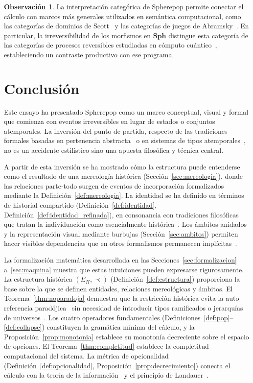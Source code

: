 \documentclass[12pt]{article}
\theoremstyle{plain}
\theoremstyle{definition}
\newtheorem{remark}[theorem]{Observación}
\begin{document}
\begin{remark}
La interpretación categórica de Spherepop permite conectar el cálculo con marcos más generales utilizados en semántica computacional, como las categorías de dominios de Scott~\cite{scottdana,abramsky} y las categorías de juegos de Abramsky~\cite{abramsky}. En particular, la irreversibilidad de los morfismos en $\mathbf{Sph}$ distingue esta categoría de las categorías de procesos reversibles estudiadas en cómputo cuántico~\cite{baez}, estableciendo un contraste productivo con ese programa.
\end{remark}

\section{Conclusión}
\label{sec:conclusion}

Este ensayo ha presentado Spherepop como un marco conceptual, visual y formal que comienza con eventos irreversibles en lugar de estados o conjuntos atemporales. La inversión del punto de partida, respecto de las tradiciones formales basadas en pertenencia abstracta~\cite{cantor,zermelo} o en sistemas de tipos atemporales~\cite{martinlof,homotopy}, no es un accidente estilístico sino una apuesta filosófica y técnica central.

A partir de esta inversión se ha mostrado cómo la estructura puede entenderse como el resultado de una mereología histórica (Sección~\ref{sec:mereologia}), donde las relaciones parte-todo surgen de eventos de incorporación formalizados mediante la Definición~\ref{def:mereologia}. La identidad se ha definido en términos de historial compartido (Definición~\ref{def:identidad}, Definición~\ref{def:identidad_refinada}), en consonancia con tradiciones filosóficas que tratan la individuación como esencialmente histórica~\cite{kim,fine,wiggins}. Los ámbitos anidados y la representación visual mediante burbujas (Sección~\ref{sec:ambitos}) permiten hacer visibles dependencias que en otros formalismos permanecen implícitas~\cite{winskel,plotkin}.

La formalización matemática desarrollada en las Secciones~\ref{sec:formalizacion} a~\ref{sec:maquina} muestra que estas intuiciones pueden expresarse rigurosamente. La estructura histórica $(E_H, \prec)$ (Definición~\ref{def:estructura}) proporciona la base sobre la que se definen entidades, relaciones mereológicas y ámbitos. El Teorema~\ref{thm:noparadoja} demuestra que la restricción histórica evita la auto-referencia paradójica~\cite{russellparadox} sin necesidad de introducir tipos ramificados o jerarquías de universos~\cite{martinlof}. Los cuatro operadores fundamentales (Definiciones~\ref{def:pop}--\ref{def:collapse}) constituyen la gramática mínima del cálculo, y la Proposición~\ref{prop:monotonia} establece su monotonía decreciente sobre el espacio de opciones. El Teorema~\ref{thm:completitud} establece la completitud computacional del sistema. La métrica de opcionalidad (Definición~\ref{def:opcionalidad}, Proposición~\ref{prop:decrecimiento}) conecta el cálculo con la teoría de la información~\cite{shannon} y el principio de Landauer~\cite{landauer,bennett}.
\end{document}
